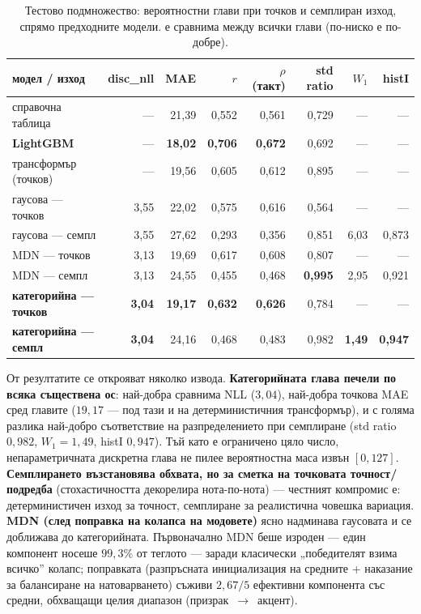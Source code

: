 \begin{table}[H]
  \centering
  \caption{Тестово подмножество: вероятностни глави при точков и семплиран изход,
  спрямо предходните модели.  е сравнима между всички глави
  (по-ниско е по-добре).}
  \label{tab:plan_c}
  \begin{tabular}{@{}lrrrrrrr@{}}
    \toprule
    модел / изход & disc\_nll & MAE & $r$ & $\rho$ (такт) & std ratio & $W_1$ & histI \\
    \midrule
    справочна таблица       & — & 21,39 & 0,552 & 0,561 & 0,729 & — & — \\
    \textbf{LightGBM}       & — & \textbf{18,02} & \textbf{0,706} & \textbf{0,672} & 0,692 & — & — \\
    трансформър (точков)     & — & 19,56 & 0,605 & 0,612 & 0,895 & — & — \\
    \midrule
    гаусова — точков         & 3,55 & 22,02 & 0,575 & 0,616 & 0,564 & — & — \\
    гаусова — семпл          & 3,55 & 27,62 & 0,293 & 0,356 & 0,851 & 6,03 & 0,873 \\
    MDN — точков             & 3,13 & 19,69 & 0,617 & 0,608 & 0,807 & — & — \\
    MDN — семпл              & 3,13 & 24,55 & 0,455 & 0,468 & \textbf{0,995} & 2,95 & 0,921 \\
    \textbf{категорийна — точков} & \textbf{3,04} & \textbf{19,17} & \textbf{0,632} & \textbf{0,626} & 0,784 & — & — \\
    \textbf{категорийна — семпл}  & \textbf{3,04} & 24,16 & 0,468 & 0,483 & 0,982 & \textbf{1,49} & \textbf{0,947} \\
    \bottomrule
  \end{tabular}
\end{table}

От резултатите се открояват няколко извода. \textbf{Категорийната глава печели по
всяка съществена ос}: най-добра сравнима NLL ($3{,}04$), най-добра точкова MAE сред
главите ($19{,}17$ — под тази и на детерминистичния трансформър), и с голяма
разлика най-добро съответствие на разпределението при семплиране (std ratio
$0{,}982$, $W_1=1{,}49$, histI $0{,}947$). Тъй като  е ограничено
цяло число, непараметричната дискретна глава не пилее вероятностна маса извън
$[0,127]$. \textbf{Семплирането възстановява обхвата, но за сметка на точковата
точност/подредба} (стохастичността декорелира нота-по-нота) — честният компромис е:
детерминистичен изход за точност, семплиране за реалистична човешка вариация.
\textbf{MDN (след поправка на колапса на модовете)} ясно надминава гаусовата и се
доближава до категорийната. Първоначално MDN беше изроден — един компонент носеше
$99{,}3\%$ от теглото — заради класически „победителят взима всичко'' колапс;
поправката (разпръсната инициализация на средните + наказание за балансиране на
натоварването) съживи $2{,}67/5$ ефективни компонента със средни, обхващащи
целия диапазон (призрак~$\to$~акцент).

